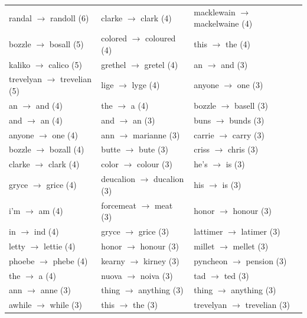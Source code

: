 \documentclass{article}
\begin{document}
\begin{table}
\begin{tabular}{l|l|l}
 randal $\rightarrow$ randoll (6) & clarke $\rightarrow$ clark (4) & macklewain $\rightarrow$ mackelwaine (4) \\
 bozzle $\rightarrow$ bosall (5) & colored $\rightarrow$ coloured (4) & this $\rightarrow$ the (4) \\
 kaliko $\rightarrow$ calico (5) & grethel $\rightarrow$ gretel (4) & an $\rightarrow$ and (3) \\
 trevelyan $\rightarrow$ trevelian (5) & lige $\rightarrow$ lyge (4) & anyone $\rightarrow$ one (3) \\
 an $\rightarrow$ and (4) & the $\rightarrow$ a (4) & bozzle $\rightarrow$ basell (3) \\
 and $\rightarrow$ an (4) & and $\rightarrow$ an (3) & buns $\rightarrow$ bunds (3) \\
 anyone $\rightarrow$ one (4) & ann $\rightarrow$ marianne (3) & carrie $\rightarrow$ carry (3) \\
 bozzle $\rightarrow$ bozall (4) & butte $\rightarrow$ bute (3) & criss $\rightarrow$ chris (3) \\
 clarke $\rightarrow$ clark (4) & color $\rightarrow$ colour (3) & he's $\rightarrow$ is (3) \\
 gryce $\rightarrow$ grice (4) & deucalion $\rightarrow$ ducalion (3) & his $\rightarrow$ is (3) \\
 i'm $\rightarrow$ am (4) & forcemeat $\rightarrow$ meat (3) & honor $\rightarrow$ honour (3) \\
 in $\rightarrow$ ind (4) & gryce $\rightarrow$ grice (3) & lattimer $\rightarrow$ latimer (3) \\
 letty $\rightarrow$ lettie (4) & honor $\rightarrow$ honour (3) & millet $\rightarrow$ mellet (3) \\
 phoebe $\rightarrow$ phebe (4) & kearny $\rightarrow$ kirney (3) & pyncheon $\rightarrow$ pension (3) \\
 the $\rightarrow$ a (4) & nuova $\rightarrow$ noiva (3) & tad $\rightarrow$ ted (3) \\
 ann $\rightarrow$ anne (3) & thing $\rightarrow$ anything (3) & thing $\rightarrow$ anything (3) \\
 awhile $\rightarrow$ while (3) & this $\rightarrow$ the (3) & trevelyan $\rightarrow$ trevelian (3) \\
\bottomrule
\end{tabular}
\end{table}
\end{document}
